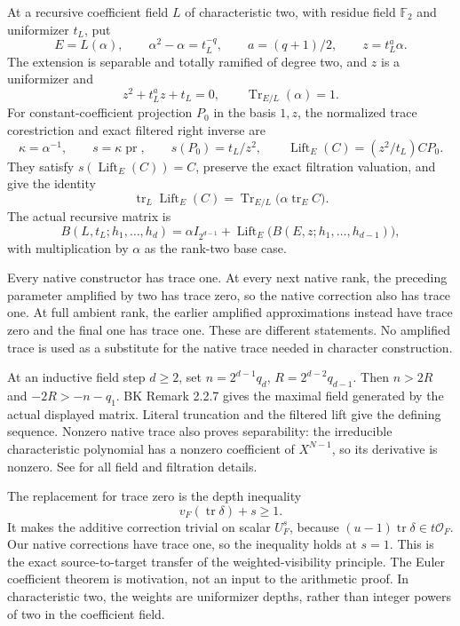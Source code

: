At a recursive coefficient field \(L\) of characteristic two, with
residue field \(\mathbb F_2\) and uniformizer \(t_L\), put \[
E=L(\alpha),\qquad \alpha^2-\alpha=t_L^{-q},\qquad
a=(q+1)/2,\qquad z=t_L^a\alpha.
\] The extension is separable and totally ramified of degree two, and \(z\)
is a uniformizer and \[
z^2+t_L^az+t_L=0,\qquad \operatorname{Tr}_{E/L}(\alpha)=1.
\] For constant-coefficient projection \(P_0\) in the basis \(1,z\), the
normalized trace corestriction and exact filtered right inverse are \[
\kappa=\alpha^{-1},\qquad s=\kappa\operatorname{pr},\qquad
s(P_0)=t_L/z^2,\qquad
\operatorname{Lift}_E(C)=(z^2/t_L)CP_0.
\] They satisfy \(s(\operatorname{Lift}_E(C))=C\), preserve the exact
filtration valuation, and give the identity \[
\operatorname{tr}_L\operatorname{Lift}_E(C)
 =\operatorname{Tr}_{E/L}
   \bigl(\alpha\operatorname{tr}_E C\bigr).
\] The actual recursive matrix is \[
B(L,t_L;h_1,\ldots,h_d)
 =\alpha I_{2^{d-1}}+
   \operatorname{Lift}_E\bigl(B(E,z;h_1,\ldots,h_{d-1})\bigr),
\] with multiplication by \(\alpha\) as the rank-two base case.

Every native constructor has trace one. At every next native rank, the
preceding parameter amplified by two has trace zero, so the native
correction also has trace one. At full ambient rank, the earlier
amplified approximations instead have trace zero and the final one has
trace one. These are different statements. No amplified trace is used as
a substitute for the native trace needed in character construction.

At an inductive field step \(d\ge2\), set \(n=2^{d-1}q_d\),
\(R=2^{d-2}q_{d-1}\). Then \(n>2R\) and \(-2R>-n-q_1\). BK Remark 2.2.7
gives the maximal field generated by the actual displayed matrix.
Literal truncation and the filtered lift give the defining sequence.
Nonzero native trace also proves separability: the irreducible
characteristic polynomial has a nonzero coefficient of \(X^{N-1}\), so
its derivative is nonzero. See 
for all field and filtration details.

The replacement for trace zero is the depth inequality \[
\boxed{v_F(\operatorname{tr}\delta)+s\ge1.}
\] It makes the additive correction trivial on scalar \(U_F^s\), because
\((u-1)\operatorname{tr}\delta\in t\mathcal O_F\). Our native
corrections have trace one, so the inequality holds at \(s=1\). This is
the exact source-to-target transfer of the weighted-visibility principle. The Euler coefficient theorem is motivation, not an input to
the arithmetic proof. In characteristic two, the weights are uniformizer
depths, rather than integer powers of two in the coefficient field.

